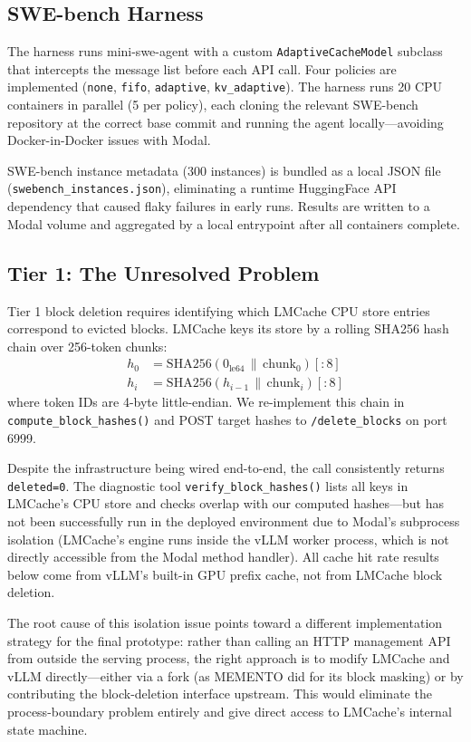\documentclass[letterpaper,twocolumn,10pt]{article}
\begin{document}
\subsection{SWE-bench Harness}

The harness runs mini-swe-agent with a custom \texttt{AdaptiveCacheModel}
subclass that intercepts the message list before each API call. Four policies
are implemented (\texttt{none}, \texttt{fifo}, \texttt{adaptive},
\texttt{kv\_adaptive}). The harness runs 20 CPU containers in parallel (5 per
policy), each cloning the relevant SWE-bench repository at the correct base
commit and running the agent locally---avoiding Docker-in-Docker issues with
Modal.

SWE-bench instance metadata (300 instances) is bundled as a local JSON file
(\texttt{swebench\_instances.json}), eliminating a runtime HuggingFace API
dependency that caused flaky failures in early runs. Results are written to a
Modal volume and aggregated by a local entrypoint after all containers complete.

\subsection{Tier 1: The Unresolved Problem}

Tier 1 block deletion requires identifying which LMCache CPU store entries
correspond to evicted blocks. LMCache keys its store by a rolling SHA256 hash
chain over 256-token chunks:
\begin{align*}
h_0 &= \text{SHA256}(0_\text{le64} \,\|\, \text{chunk}_0)[:8] \\
h_i &= \text{SHA256}(h_{i-1} \,\|\, \text{chunk}_i)[:8]
\end{align*}
where token IDs are 4-byte little-endian. We re-implement this chain in
\texttt{compute\_block\_hashes()} and POST target hashes to
\texttt{/delete\_blocks} on port 6999.

Despite the infrastructure being wired end-to-end, the call consistently
returns \texttt{deleted=0}. The diagnostic tool \texttt{verify\_block\_hashes()}
lists all keys in LMCache's CPU store and checks overlap with our computed
hashes---but has not been successfully run in the deployed environment due to
Modal's subprocess isolation (LMCache's engine runs inside the vLLM worker
process, which is not directly accessible from the Modal method handler).
All cache hit rate results below come from vLLM's built-in GPU prefix cache,
not from LMCache block deletion.

The root cause of this isolation issue points toward a different
implementation strategy for the final prototype: rather than calling an
HTTP management API from outside the serving process, the right approach is
to modify LMCache and vLLM directly---either via a fork (as MEMENTO did for
its block masking) or by contributing the block-deletion interface upstream.
This would eliminate the process-boundary problem entirely and give direct
access to LMCache's internal state machine.
\end{document}
